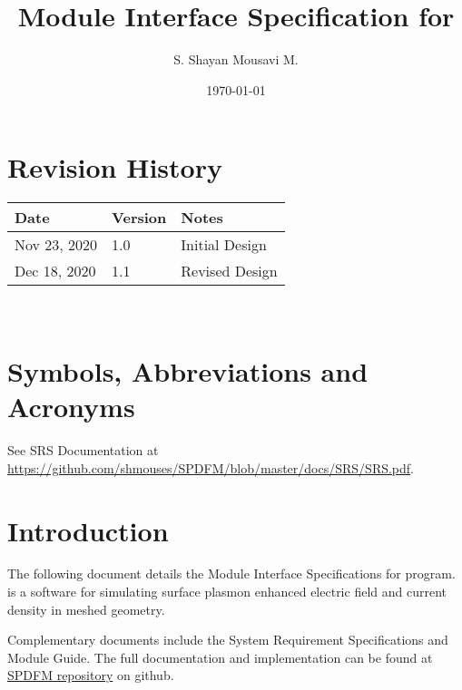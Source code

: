 \documentclass[12pt, titlepage]{article}
\begin{document}
	
	\title{Module Interface Specification for \progname{}}
	
	\author{S. Shayan Mousavi M.}
	
	\date{\today}
	
	\maketitle
	
	
	\section{Revision History}
	
	\begin{tabularx}{\textwidth}{p{3cm}p{2cm}X} \toprule {\bf Date} & {\bf Version}
		& {\bf Notes}\\ \midrule Nov 23, 2020 & 1.0 & Initial Design\\ 
		 Dec 18, 2020 & 1.1 & Revised Design\\
		\bottomrule \end{tabularx}
	
	~\newpage
	
	\section{Symbols, Abbreviations and Acronyms}
	
	See SRS Documentation at
	\url{https://github.com/shmouses/SPDFM/blob/master/docs/SRS/SRS.pdf}.
	
	
	\newpage
	
	\tableofcontents
	
	\newpage
	
	
	\section{Introduction}
	
	The following document details the Module Interface Specifications for
	\progname{} program. \progname{} is a software for simulating surface plasmon
	enhanced electric field and current density in meshed geometry.
	
	Complementary documents include the System Requirement Specifications and Module
	Guide.  The full documentation and implementation can be found at
	\href{https://github.com/shmouses/SPDFM}{SPDFM repository} on github.
	
\end{document}
